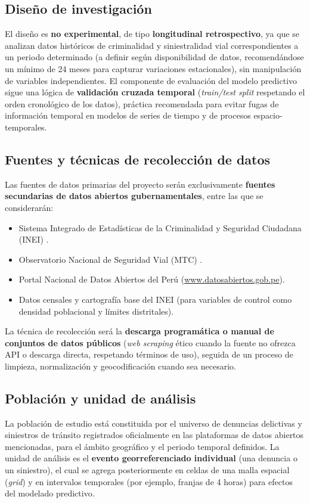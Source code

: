 \documentclass[12pt,letterpaper]{report}
\begin{document}
\subsection{Dise\~no de investigaci\'on}
El dise\~no es \textbf{no experimental}, de tipo \textbf{longitudinal retrospectivo}, ya que se analizan datos hist\'oricos de criminalidad y siniestralidad vial correspondientes a un periodo determinado (a definir seg\'un disponibilidad de datos, recomend\'andose un m\'inimo de 24 meses para capturar variaciones estacionales), sin manipulaci\'on de variables independientes. El componente de evaluaci\'on del modelo predictivo sigue una l\'ogica de \textbf{validaci\'on cruzada temporal} (\textit{train/test split} respetando el orden cronol\'ogico de los datos), pr\'actica recomendada para evitar fugas de informaci\'on temporal en modelos de series de tiempo y de procesos espacio-temporales.

\subsection{Fuentes y t\'ecnicas de recolecci\'on de datos}
Las fuentes de datos primarias del proyecto ser\'an exclusivamente \textbf{fuentes secundarias de datos abiertos gubernamentales}, entre las que se considerar\'an:
\begin{itemize}
    \item Sistema Integrado de Estad\'isticas de la Criminalidad y Seguridad Ciudadana (INEI) \citep{inei2022sistema}.
    \item Observatorio Nacional de Seguridad Vial (MTC) \citep{mtc2024observatorio}.
    \item Portal Nacional de Datos Abiertos del Per\'u (\url{www.datosabiertos.gob.pe}).
    \item Datos censales y cartograf\'ia base del INEI (para variables de control como densidad poblacional y l\'imites distritales).
\end{itemize}
La t\'ecnica de recolecci\'on ser\'a la \textbf{descarga program\'atica o manual de conjuntos de datos p\'ublicos} (\textit{web scraping} \'etico cuando la fuente no ofrezca API o descarga directa, respetando t\'erminos de uso), seguida de un proceso de limpieza, normalizaci\'on y geocodificaci\'on cuando sea necesario.

\subsection{Poblaci\'on y unidad de an\'alisis}
La poblaci\'on de estudio est\'a constituida por el universo de denuncias delictivas y siniestros de tr\'ansito registrados oficialmente en las plataformas de datos abiertos mencionadas, para el \'ambito geogr\'afico y el periodo temporal definidos. La unidad de an\'alisis es el \textbf{evento georreferenciado individual} (una denuncia o un siniestro), el cual se agrega posteriormente en celdas de una malla espacial (\textit{grid}) y en intervalos temporales (por ejemplo, franjas de 4 horas) para efectos del modelado predictivo.
\end{document}
